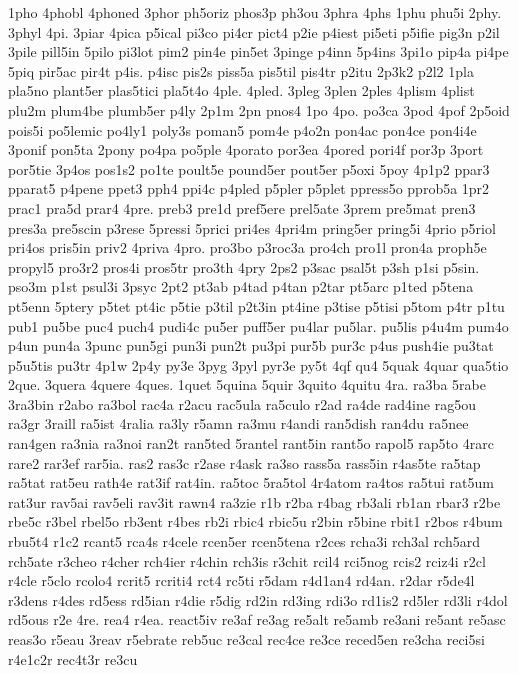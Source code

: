 {1pho
4phobl
4phoned
3phor
ph5oriz
phos3p
ph3ou
3phra
4phs
1phu
phu5i
2phy.
3phyl
4pi.
3piar
4pica
p5ical
pi3co
pi4cr
pict4
p2ie
p4iest
pi5eti
p5ifie
pig3n
p2il
3pile
pill5in
5pilo
pi3lot
pim2
pin4e
pin5et
3pinge
p4inn
5p4ins
3pi1o
pip4a
pi4pe
5piq
pir5ac
pir4t
p4is.
p4isc
pis2s
piss5a
pis5til
pis4tr
p2itu
2p3k2
p2l2
1pla
pla5no
plant5er
plas5tici
pla5t4o
4ple.
4pled.
3pleg
3plen
2ples
4plism
4plist
plu2m
plum4be
plumb5er
p4ly
2p1m
2pn
pnos4
1po
4po.
po3ca
3pod
4pof
2p5oid
pois5i
po5lemic
po4ly1
poly3s
poman5
pom4e
p4o2n
pon4ac
pon4ce
pon4i4e
3ponif
pon5ta
2pony
po4pa
po5ple
4porato
por3ea
4pored
pori4f
por3p
3port
por5tie
3p4os
pos1s2
po1te
poult5e
pound5er
pout5er
p5oxi
5poy
4p1p2
ppar3
pparat5
p4pene
ppet3
pph4
ppi4c
p4pled
p5pler
p5plet
ppress5o
pprob5a
1pr2
prac1
pra5d
prar4
4pre.
preb3
pre1d
pref5ere
prel5ate
3prem
pre5mat
pren3
pres3a
pre5scin
p3rese
5pressi
5prici
pri4es
4pri4m
pring5er
pring5i
4prio
p5riol
pri4os
pris5in
priv2
4priva
4pro.
pro3bo
p3roc3a
pro4ch
pro1l
pron4a
proph5e
propyl5
pro3r2
pros4i
pros5tr
pro3th
4pry
2ps2
p3sac
psal5t
p3sh
p1si
p5sin.
pso3m
p1st
psul3i
3psyc
2pt2
pt3ab
p4tad
p4tan
p2tar
pt5arc
p1ted
p5tena
pt5enn
5ptery
p5tet
pt4ic
p5tie
p3til
p2t3in
pt4ine
p3tise
p5tisi
p5tom
p4tr
p1tu
pub1
pu5be
puc4
puch4
pudi4c
pu5er
puff5er
pu4lar
pu5lar.
pu5lis
p4u4m
pum4o
p4un
pun4a
3punc
pun5gi
pun3i
pun2t
pu3pi
pur5b
pur3c
p4us
push4ie
pu3tat
p5u5tis
pu3tr
4p1w
2p4y
py3e
3pyg
3pyl
pyr3e
py5t
4qf
qu4
5quak
4quar
qua5tio
2que.
3quera
4quere
4ques.
1quet
5quina
5quir
3quito
4quitu
4ra.
ra3ba
5rabe
3ra3bin
r2abo
ra3bol
rac4a
r2acu
rac5ula
ra5culo
r2ad
ra4de
rad4ine
rag5ou
ra3gr
3raill
ra5ist
4ralia
ra3ly
r5amn
ra3mu
r4andi
ran5dish
ran4du
ra5nee
ran4gen
ra3nia
ra3noi
ran2t
ran5ted
5rantel
rant5in
rant5o
rapol5
rap5to
4rarc
rare2
rar3ef
rar5ia.
ras2
ras3c
r2ase
r4ask
ra3so
rass5a
rass5in
r4as5te
ra5tap
ra5tat
rat5eu
rath4e
rat3if
rat4in.
ra5toc
5ra5tol
4r4atom
ra4tos
ra5tui
rat5um
rat3ur
rav5ai
rav5eli
rav3it
rawn4
ra3zie
r1b
r2ba
r4bag
rb3ali
rb1an
rbar3
r2be
rbe5c
r3bel
rbel5o
rb3ent
r4bes
rb2i
rbic4
rbic5u
r2bin
r5bine
rbit1
r2bos
r4bum
rbu5t4
r1c2
rcant5
rca4s
r4cele
rcen5er
rcen5tena
r2ces
rcha3i
rch3al
rch5ard
rch5ate
r3cheo
r4cher
rch4ier
r4chin
rch3is
r3chit
rcil4
rci5nog
rcis2
rciz4i
r2cl
r4cle
r5clo
rcolo4
rcrit5
rcriti4
rct4
rc5ti
r5dam
r4d1an4
rd4an.
r2dar
r5de4l
r3dens
r4des
rd5ess
rd5ian
r4die
r5dig
rd2in
rd3ing
rdi3o
rd1is2
rd5ler
rd3li
r4dol
rd5ous
r2e
4re.
rea4
r4ea.
react5iv
re3af
re3ag
re5alt
re5amb
re3ani
re5ant
re5asc
reas3o
r5eau
3reav
r5ebrate
reb5uc
re3cal
rec4ce
re3ce
reced5en
re3cha
reci5si
r4e1c2r
rec4t3r
re3cu
}
